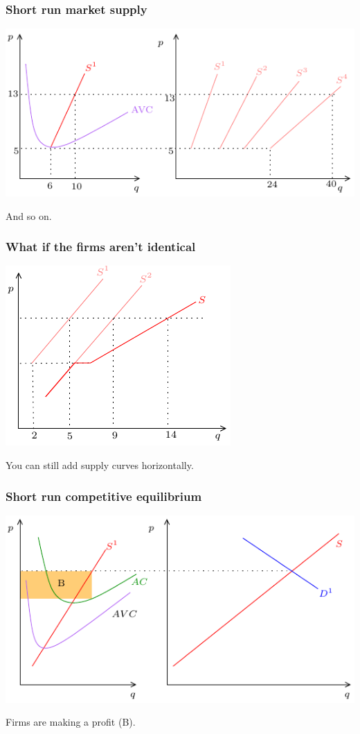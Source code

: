 \documentclass[xcolor=pdftex,dvipsnames]{beamer}
\begin{document}
\begin{frame}\frametitle{Short run market supply}
\begin{center}
\includegraphics{pics/MarketSupply3}
\end{center}
And so on.
\end{frame} 





\begin{frame}\frametitle{What if the firms aren't identical}
\begin{center}
\includegraphics{pics/AsymMarketSupply}
\end{center}
 You can still add supply curves horizontally.
\end{frame} 





\begin{frame}\frametitle{Short run competitive equilibrium}
\begin{center}
\includegraphics{pics/Equilibrium1}
\end{center}
Firms are making a profit (B).
\end{frame} 
\end{document}
